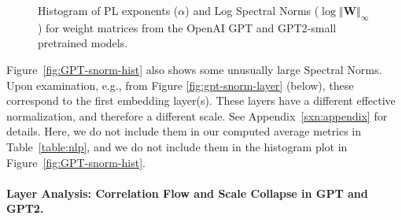 \begin{figure}[h]
    \centering
    \qquad
   \caption{Histogram of PL exponents ($\alpha$) and Log Spectral Norms ($\log\Vert\mathbf{W}\Vert_{\infty}$) for weight matrices from the OpenAI GPT and GPT2-small pretrained models.}
   
\label{fig:GPT-hist}
\end{figure}


Figure~\ref{fig:GPT-snorm-hist} also shows some unusually large Spectral Norms.
Upon examination, e.g., from Figure \ref{fig:gpt-snorm-layer} (below), these correspond to the first embedding layer(s).
These layers have a different effective normalization, and therefore a different scale.
See Appendix~\ref{sxn:appendix} for details.
Here, we do not include them in our computed average metrics in Table~\ref{table:nlp}, and we do not include them in the histogram plot in Figure~\ref{fig:GPT-snorm-hist}.



\paragraph{Layer Analysis: Correlation Flow and Scale Collapse in GPT and GPT2.} 

